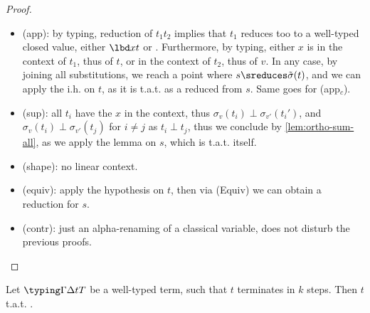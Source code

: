 \begin{proof}
\begin{itemize}
    \item (app): by typing, reduction of $t_1t_2$ implies
      that $t_1$ reduces too to a well-typed closed value,
      \ie either $\lbd x t$ or \textletrec{}.
      Furthermore, by typing,
      either $x$ is in the context of $t_1$, thus of $t$, or in
      the context of $t_2$, thus of $v$.
      In any case, by joining all substitutions, we reach a point
      where $s \sreduces \tilde \sigma(t)$, and we can apply the i.h. on $t$,
      as it is t.a.t. as a reduced from $s$. Same goes for (app$_c$).

    \item (sup): all $t_i$ have the $x$ in the context, thus
      $\sigma_v(t_i) \perp \sigma_{v'}(t_i')$,
      and $\sigma_v(t_i) \perp \sigma_{v'}(t_j)$ for $i \neq j$ as
      $t_i \perp t_j$, thus we conclude by \autoref{lem:ortho-sum-all},
      as we apply the lemma on $s$, which is t.a.t. itself.

    \item (shape): no linear context.

    \item (equiv): apply the hypothesis on $t$, then via (Equiv) we
      can obtain a reduction for $s$.

    \item (contr): just an alpha-renaming of a classical variable,
      does not disturb the previous proofs. \qedhere
  \end{itemize}
\end{proof}

\begin{lemma}
  \label{lem:subred-strong}
  Let $\typing \Gamma \Delta t T$ be a well-typed term,
  such that $t$ terminates in $k$ steps.
  Then $t$ t.a.t. .
\end{lemma}

